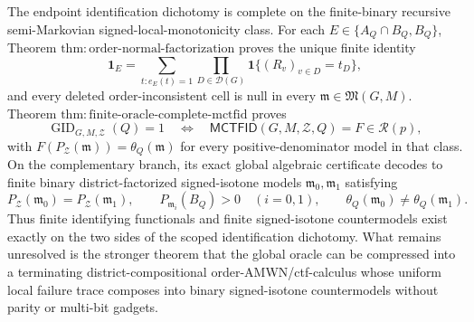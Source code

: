 The endpoint identification dichotomy is complete on the finite-binary recursive semi-Markovian signed-local-monotonicity class.  For each \(E\in\{A_Q\cap B_Q,B_Q\}\), Theorem \(\mathrm{thm:order\text{-}normal\text{-}factorization}\) proves the unique finite identity
\[
 \mathbf 1_E=
 \sum_{t:e_E(t)=1}
 \prod_{D\in\mathcal D(G)}
 \mathbf 1\{(R_v)_{v\in D}=t_D\},
\]
and every deleted order-inconsistent cell is null in every \(\mathfrak m\in\mathfrak M(G,M)\).  Theorem \(\mathrm{thm:finite\text{-}oracle\text{-}complete\text{-}mctfid}\) proves
\[
 \operatorname{GID}_{G,M,\mathcal Z}(Q)=1
 \quad\Longleftrightarrow\quad
 \mathsf{MCTFID}(G,M,\mathcal Z,Q)=F\in\mathcal R(p),
\]
with \(F(P_{\mathcal Z}(\mathfrak m))=\theta_Q(\mathfrak m)\) for every positive-denominator model in that class.  On the complementary branch, its exact global algebraic certificate decodes to finite binary district-factorized signed-isotone models \(\mathfrak m_0,\mathfrak m_1\) satisfying
\[
 P_{\mathcal Z}(\mathfrak m_0)=P_{\mathcal Z}(\mathfrak m_1),
 \qquad
 P_{\mathfrak m_i}(B_Q)>0\quad(i=0,1),
 \qquad
 \theta_Q(\mathfrak m_0)\ne\theta_Q(\mathfrak m_1).
\]
Thus finite identifying functionals and finite signed-isotone countermodels exist exactly on the two sides of the scoped identification dichotomy.  What remains unresolved is the stronger theorem that the global oracle can be compressed into a terminating district-compositional order-AMWN/ctf-calculus whose uniform local failure trace composes into binary signed-isotone countermodels without parity or multi-bit gadgets.